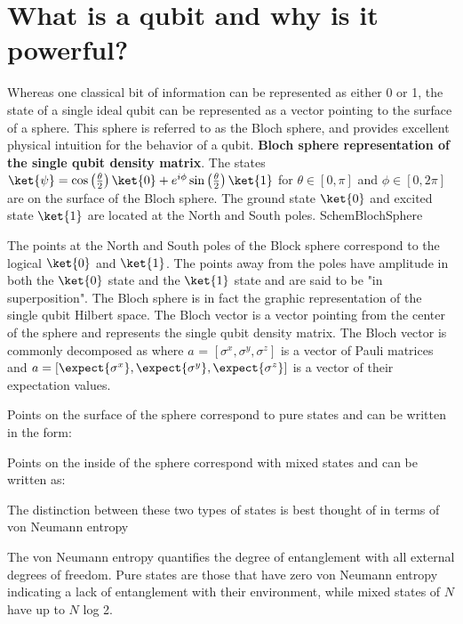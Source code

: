 \section{What is a qubit and why is it powerful?}
Whereas one classical bit of information can be represented as either 0 or 1, the state of a single ideal qubit can be represented as a vector pointing to the surface of a sphere.
This sphere is referred to as the Bloch sphere, and provides excellent physical intuition for the behavior of a qubit.
{\textbf{Bloch sphere representation of the single qubit density matrix}.
The states $\ket{\psi} = \cos \left( \frac{\theta}{2} \right) \ket{0} + e^{i \phi} \sin \left( \frac{\theta}{2} \right)\ket{1}$ for
$\theta \in [0, \pi]$ and $\phi \in [0, 2 \pi]$ are on the surface of the Bloch sphere.
The ground state $\ket{0}$ and excited state $\ket{1}$ are located at the North and South poles.
}
{SchemBlochSphere}

The points at the North and South poles of the Block sphere correspond to the logical $\ket{0}$ and $\ket{1}$.
The points away from the poles have amplitude in both the $\ket{0}$ state and the $\ket{1}$ state and are said to be "in superposition".
The Bloch sphere is in fact the graphic representation of the single qubit Hilbert space.
The Bloch vector is a vector pointing from the center of the sphere and represents the single qubit density matrix.
The Bloch vector is commonly decomposed as
where $a$ = $[\sigma^x, \sigma^y, \sigma^z]$ is a vector of Pauli matrices and $a  = \left[\expect{\sigma^x}, \expect{\sigma^y}, \expect{\sigma^z} \right]$ is a vector of their expectation values.

Points on the surface of the sphere correspond to pure states and can be written in the form:
\qeqn{ \hat{\rho} = \ket{\psi} \bra{\psi} }

Points on the inside of the sphere correspond with mixed states and can be written as:

The distinction between these two types of states is best thought of in terms of von Neumann entropy

The von Neumann entropy quantifies the degree of entanglement with all external degrees of freedom.
Pure states are those that have zero von Neumann entropy indicating a lack of entanglement with their environment,
while mixed states of $N$ have up to  $N$ log 2.

